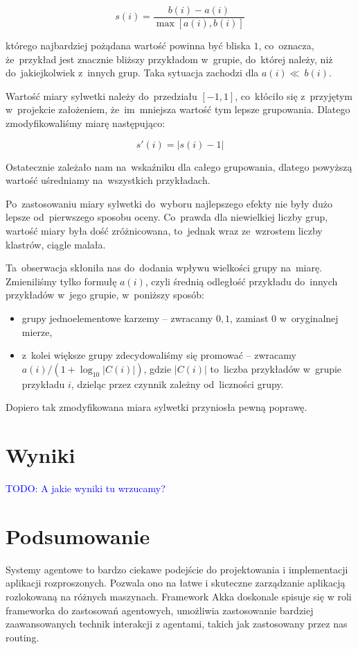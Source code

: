 \documentclass[a4paper,12pt]{mwart}
\newcommand{\TODO}[1]{\textcolor{blue}{TODO: #1 \\}}
\begin{document}
\[s(i) = \frac{b(i) - a(i)}{\max[a(i), b(i)]}\]

którego najbardziej pożądana wartość powinna być bliska $1$, co~oznacza,
że~przykład jest znacznie bliższy przykładom w~grupie, do~której należy, niż
do~jakiejkolwiek z~innych grup. Taka sytuacja zachodzi dla $a(i) \ll~b(i)$.

Wartość miary sylwetki należy do~przedziału $[-1, 1]$, co~kłóciło się
z~przyjętym w~projekcie założeniem, że~im~mniejsza wartość tym lepsze
grupowania. Dlatego zmodyfikowaliśmy miarę następująco:

\[s'(i) = \left | s(i) - 1 \right | \]

Ostatecznie zależało nam na~wskaźniku dla całego grupowania, dlatego powyższą
wartość uśredniamy na~wszystkich przykładach.

Po~zastosowaniu miary sylwetki do~wyboru najlepszego efekty nie były dużo
lepsze od~pierwszego sposobu oceny. Co~prawda dla niewielkiej liczby grup,
wartość miary była dość zróżnicowana, to~jednak wraz ze~wzrostem liczby
klastrów, ciągle malała.

Ta~obserwacja skłoniła nas do~dodania wpływu wielkości grupy na~miarę.
Zmieniliśmy tylko formułę $a(i)$, czyli średnią odległość przykładu do~innych
przykładów w~jego grupie, w~poniższy sposób:

\begin{itemize}
\item grupy jednoelementowe karzemy -- zwracamy $0{,}1$, zamiast $0$
  w~oryginalnej mierze,
\item z~kolei większe grupy zdecydowaliśmy się promować -- zwracamy $a(i) /
  \left (1 + \log_{10} \left | C(i) \right | \right)$, gdzie $\left | C(i)
  \right |$ to~liczba przykładów w~grupie przykładu $i$, dzieląc przez czynnik
  zależny od~liczności grupy.
\end{itemize}

Dopiero tak zmodyfikowana miara sylwetki przyniosła pewną poprawę.

\section{Wyniki}
\TODO{A jakie wyniki tu wrzucamy?}

\section{Podsumowanie}
Systemy agentowe to bardzo ciekawe podejście do projektowania i implementacji
aplikacji rozproszonych. Pozwala ono na łatwe i skuteczne zarządzanie aplikacją
rozlokowaną na różnych maszynach. Framework Akka doskonale spisuje się w roli
frameworka do zastosowań agentowych, umożliwia zastosowanie bardziej
zaawansowanych technik interakcji z agentami, takich jak zastosowany przez nas
routing.
\end{document}

